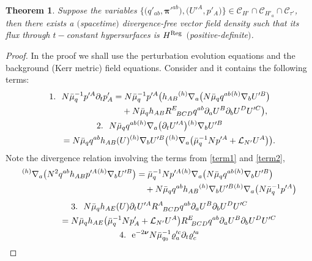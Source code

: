 \documentclass[pdftex]{sigma}
\def\ptl{\partial}%
\def\mbo#1{\boldsymbol{#1}}%
\def\grad{{\nabla}}%
\newcommand{\leftexp}[2]{{\vphantom{#2}}^{#1}{#2}}
\numberwithin{equation}{section}
\newtheorem{Theorem}{Theorem}[section]
\begin{document}
\begin{Theorem}
Suppose the variables $\bigl\{ \bigl(q'_{ab}, \mbo{\pi}'^{ab}\bigr), \bigl(U'^A, p'_A\bigr) \bigr\} \in \mathscr{C}_{H'} \cap \mathscr{C}_{H'_a} \cap \mathscr{C}_{\tau'}$, then there exists a $($spacetime$)$ divergence-free vector field density such that its flux through $t-$constant hypersurfaces is $H^{{\rm Reg}}$ $($positive-definite$)$.
\end{Theorem}
\begin{proof}
In the proof we shall use the perturbation evolution equations and the background (Kerr metric) field equations. Consider \smash{$\ptl_t \mathbf{e}^{{\rm Reg}}$} and it contains the following terms:
\begin{gather}
1. \ \ N \bar{\mu}^{-1}_q p'^A \ptl_t p'_A= N \bar{\mu}^{-1}_q p'^A \bigl(h_{AB} \leftexp{(h)}{\grad}_a \bigl(N \bar{\mu}_q q^{ab} \leftexp{(h)}{\grad}_b U'^B\bigr) \notag\\
\hphantom{1. \ N \bar{\mu}^{-1}_q p'^A \ptl_t p'_A=}{} + N \bar{\mu}_q h_{AB} R^E_{\,\,\,\, BCD} q^{ab} \ptl_a U^B \ptl_b U^D U'^C \bigr),\label{term1}
\\
2. \ \ N \bar{\mu}_q q^{ab} \leftexp{(h)}{\grad}_a \bigl(\ptl_t U'^A\bigr) \leftexp{(h)}{\grad}_b U'^B \notag\\
 \qquad{}= N \bar{\mu}_q q^{ab} h_{AB}(U) \leftexp{(h)}{\grad}_b U'^B \bigl(\leftexp{(h)}{\grad}_a \bigl(\bar{\mu}^{-1}_q Np'^A + \mathcal{L}_{N'} U^A\bigr)\bigr).\label{term2}
 \end{gather}
 Note the divergence relation involving the terms from \eqref{term1} and \eqref{term2},
 \begin{align*}
 \leftexp{(h)}{\grad}_a \bigl(N^2 q^{ab} h_{AB} p'^A \leftexp{(h)}{\grad}_b U'^B\bigr) &{}= \bar{\mu}^{-1}_q N p'^A \leftexp{(h)}{\grad}_a \bigl(N \bar{\mu}_q q^{ab} \leftexp{(h)}{\grad}_b U'^B\bigr) \notag\\
 & \quad{}+ N \bar{\mu}_q q^{ab} h_{AB} \leftexp{(h)}{\grad}_b U'^B \leftexp{(h)}{\grad}_a \bigl(N \bar{\mu}^{-1}_q p'^A\bigr)
 \end{align*}
\begin{gather*}
3. \ \ N \bar{\mu}_q h_{AE}(U) \ptl_t U'^A R^A_{\,\,\,\,BCD} q^{ab} \ptl_a U^B \ptl_b U^D U'^C \notag\\
 \qquad{}=N \bar{\mu}_q h_{AE} \bigl(\bar{\mu}^{-1}_q N p'_A + \mathcal{L}_{N'} U^A\bigr) R^E_{\,\,\,BCD} q^{ab} \ptl_a U^B \ptl_b U^D U'^C
\\
 4. \ \ {\rm e}^{-2 \mbo{\nu}} N \bar{\mu}^{-1}_{q_0} \varrho'^c_a \ptl_t \varrho'^a_c \\

\end{gather*}
\end{proof}
\end{document}
